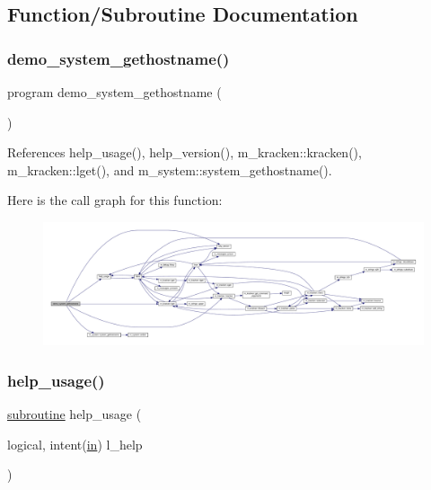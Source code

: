 \subsection{Function/\+Subroutine Documentation}
\mbox{\label{__hostname_8f90_a8cf8b2c2d1597761d376d337686d3667}} 
\subsubsection{\texorpdfstring{demo\+\_\+system\+\_\+gethostname()}{demo\_system\_gethostname()}}
{\footnotesize\ttfamily program demo\+\_\+system\+\_\+gethostname (\begin{DoxyParamCaption}{ }\end{DoxyParamCaption})}



References help\+\_\+usage(), help\+\_\+version(), m\+\_\+kracken\+::kracken(), m\+\_\+kracken\+::lget(), and m\+\_\+system\+::system\+\_\+gethostname().

Here is the call graph for this function\+:
\nopagebreak
\begin{figure}[H]
\begin{center}
\leavevmode
\includegraphics[width=350pt]{__hostname_8f90_a8cf8b2c2d1597761d376d337686d3667_cgraph}
\end{center}
\end{figure}
\mbox{\label{__hostname_8f90_a3e09a3b52ee8fb04eeb93fe5761626a8}} 
\subsubsection{\texorpdfstring{help\+\_\+usage()}{help\_usage()}}
{\footnotesize\ttfamily \hyperlink{M__stopwatch_83_8txt_acfbcff50169d691ff02d4a123ed70482}{subroutine} help\+\_\+usage (\begin{DoxyParamCaption}\item[{logical, intent(\hyperlink{M__journal_83_8txt_afce72651d1eed785a2132bee863b2f38}{in})}]{l\+\_\+help }\end{DoxyParamCaption})}



